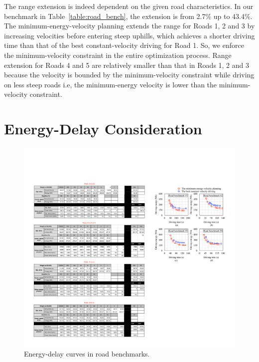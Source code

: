 \documentclass{IEEEtran}
\begin{document}
The range extension is indeed dependent on the given road characteristics. In our benchmark in Table~\ref{table:road_bench}, the extension is from 2.7\% up to 43.4\%. The minimum-energy-velocity planning extends the range for Roads 1, 2 and  3 by increasing velocities before entering steep uphills, which achieves a shorter driving time than that of the best constant-velocity driving for Road 1. So, we enforce the minimum-velocity constraint in the entire optimization process. Range extension for Roads 4 and 5 are relatively smaller than that in Roads 1, 2 and 3 because the velocity is bounded by the minimum-velocity constraint while driving on less steep roads i.e, the minimum-energy velocity is lower than the minimum-velocity constraint.

\section{Energy-Delay Consideration} \label{sec:ed_consideration}

\begin{figure} 	%
\centering
\includegraphics[width=\hsize]{Figures/ED_curve.pdf}
\caption{Energy-delay curves in road benchmarks.}
\label{fig:energy_delay_curve}
\end{figure} 
\end{document}
